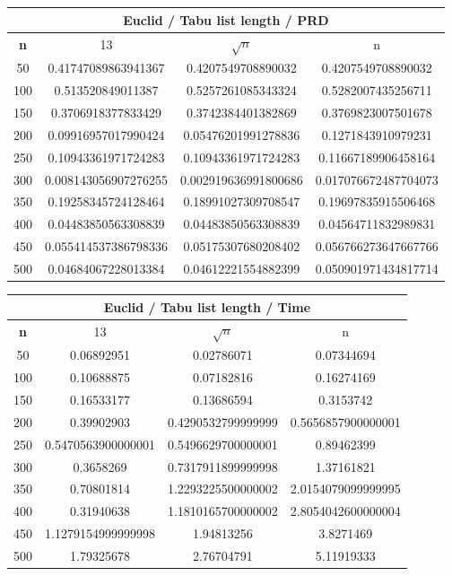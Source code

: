 \documentclass{article}
\begin{document}
\begin{center}
\begin{tabular}{|c|c|c|c|}
\hline
\multicolumn{4}{|c|}{\textbf{Euclid / Tabu list length / PRD}}\\
\hline
\textbf{n} & 13 & $\sqrt{n}$ & n\\
\hline
50 & 0.41747089863941367 & 0.4207549708890032 & 0.4207549708890032\\
\hline
100 & 0.513520849011387 & 0.5257261085343324 & 0.5282007435256711\\
\hline
150 & 0.3706918377833429 & 0.3742384401382869 & 0.3769823007501678\\
\hline
200 & 0.09916957017990424 & 0.05476201991278836 & 0.1271843910979231\\
\hline
250 & 0.10943361971724283 & 0.10943361971724283 & 0.11667189906458164\\
\hline
300 & 0.008143056907276255 & 0.002919636991800686 & 0.017076672487704073\\
\hline
350 & 0.19258345724128464 & 0.18991027309708547 & 0.19697835915506468\\
\hline
400 & 0.04483850563308839 & 0.04483850563308839 & 0.04564711832989831\\
\hline
450 & 0.055414537386798336 & 0.05175307680208402 & 0.056766273647667766\\
\hline
500 & 0.04684067228013384 & 0.04612221554882399 & 0.050901971434817714\\
\hline
\end{tabular}
\end{center}


\begin{center}
\begin{tabular}{|c|c|c|c|}
\hline
\multicolumn{4}{|c|}{\textbf{Euclid / Tabu list length / Time}}\\
\hline
\textbf{n} & 13 & $\sqrt{n}$ & n\\
\hline
50 & 0.06892951 & 0.02786071 & 0.07344694\\
\hline
100 & 0.10688875 & 0.07182816 & 0.16274169\\
\hline
150 & 0.16533177 & 0.13686594 & 0.3153742\\
\hline
200 & 0.39902903 & 0.4290532799999999 & 0.5656857900000001\\
\hline
250 & 0.5470563900000001 & 0.5496629700000001 & 0.89462399\\
\hline
300 & 0.3658269 & 0.7317911899999998 & 1.37161821\\
\hline
350 & 0.70801814 & 1.2293225500000002 & 2.0154079099999995\\
\hline
400 & 0.31940638 & 1.1810165700000002 & 2.8054042600000004\\
\hline
450 & 1.1279154999999998 & 1.94813256 & 3.8271469\\
\hline
500 & 1.79325678 & 2.76704791 & 5.11919333\\
\hline
\end{tabular}
\end{center}
\end{document}
